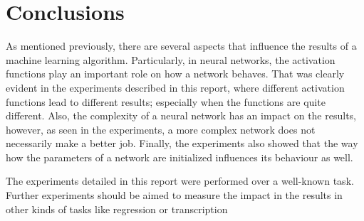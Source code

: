 \documentclass{article}
\begin{document}
\section{Conclusions}
\label{sec:concl}
As mentioned previously, there are several aspects that influence the results of a machine learning algorithm. Particularly, in neural networks, the activation functions play an important role on how a network behaves. That was clearly evident in the experiments described in this report, where different activation functions lead to different results; especially when the functions are quite different. Also, the complexity of a neural network has an impact on the results, however, as seen in the experiments, a more complex network does not necessarily make a better job. Finally, the experiments also showed that the way how the parameters of a network are initialized influences its behaviour as well.

The experiments detailed in this report were performed over a well-known task. Further experiments should be aimed to measure the impact in the results in other kinds of tasks like regression or transcription



\end{document}
